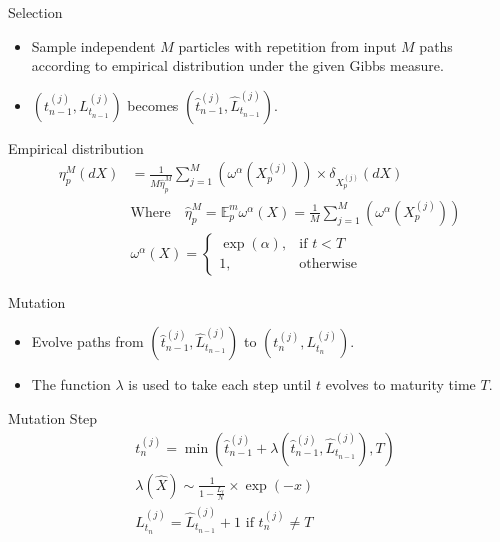 \begin{frame}{Selection}
	\begin{itemize}
		\item Sample independent $M$ particles with repetition from input $M$ paths according to empirical distribution under the given Gibbs measure.
		\item $\left(t^{(j)}_{n-1}, L_{t_{n-1}}^{(j)} \right)$ becomes $\left( \hat{t}_{n-1}^{(j)}, \hat{L}_{t_{n-1}}^{(j)}\right)$.
	\end{itemize}
	\begin{block}{Empirical distribution}
		\begin{equation*}
			\begin{split}
				\eta_{p}^{M}(dX) &= \frac{1}{M \hat{\eta}_{p}^{M}}\sum_{j=1}^{M}\left(\omega^{\alpha}(X_{p}^{(j)})\right) \times \delta_{{X}_p^{(j)}}(dX) \\
				&\text{Where} \quad
				\hat{\eta}_{p}^{M} = \mathbb{E}_{p}^{m}\omega^{\alpha}(X) =
				\frac{1}{M}\sum_{j=1}^{M}\left(\omega^{\alpha}(X_{p}^{(j)})\right)\\
				&\omega^{\alpha}(X)= 
                		\begin{cases}
    						\exp(\alpha),& \text{if } t < T\\
    						1,              & \text{otherwise}
						 \end{cases}
		    \end{split}
		\end{equation*}
	\end{block}
\end{frame}

\begin{frame}{Mutation}
	\begin{itemize}
		\item Evolve paths from $\left( \hat{t}_{n-1}^{(j)}, \hat{L}_{t_{n-1}}^{(j)}\right)$ to $\left(t^{(j)}_{n}, L_{t_{n}}^{(j)} \right)$.
		\item The function $\lambda$ is used to take each step until $t$ evolves to maturity time $T$. 
	\end{itemize}
	\begin{block}{Mutation Step}
		\begin{equation*}
				\begin{split}
					&t^{(j)}_{n}= \min\left(\hat{t}^{(j)}_{n-1} + \lambda\left(\hat{t}^{(j)}_{n-1},\hat{L}_{t_{n-1}}^{(j)}\right),T\right) \\
					& \lambda\left(\hat{X}\right) \sim \frac{1}{1-\frac{L_{t}}{N}} \times \exp(-x) \\
					&L_{t_{n}}^{(j)} = \hat{L}_{t_{n-1}}^{(j)} + 1 \text{ if } t^{(j)}_{n} 		\neq T					
				\end{split}	
		\end{equation*}
	\end{block}
\end{frame}

